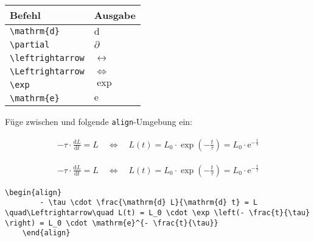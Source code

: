 \documentclass["WS\space 16-17\space -\space LaTeX-Kurs\space -\space Praesentation\space -\space 1.tex"]{subfiles}
\begin{document}
\begin{frame}[fragile]
	\begin{center}
		\begin{tabular}{ll}
			\toprule
			Befehl							&	Ausgabe					\\ \midrule
			\lstinline|\mathrm{d}|		&	$\mathrm{d}$		\\
			\lstinline|\partial|		&	$\partial$		
			\\
			\lstinline|\leftrightarrow|		&	$\leftrightarrow$		
      \\
			\lstinline|\Leftrightarrow|		&	$\Leftrightarrow$		
			\\
			\lstinline|\exp|					&	$\exp$		\\
      \lstinline|\mathrm{e}|		& $\mathrm{e}$		\\
			\bottomrule
		\end{tabular}
	\end{center}
	\pause\btVFill
	\Aufgabee
	Füge zwischen \qquote{$\tau$} und  folgende \lstinline[basicstyle=\normalfont\normalsize]|align|-Umgebung ein:
	\begin{outputbox}
	    \begin{align}
	      - \tau \cdot \frac{\mathrm{d} L}{\mathrm{d} t} = L \quad\Leftrightarrow\quad L(t) = L_0 \cdot \exp \left(- \frac{t}{\tau} \right) = L_0 \cdot \mathrm{e}^{- \frac{t}{\tau}}
	    \end{align}	
    \end{outputbox}
	\vspace{0.3cm}
\end{frame}
\begin{frame}[fragile]
	\Losung
	\begin{outputbox}
	    \begin{align}
	        - \tau \cdot \frac{\mathrm{d} L}{\mathrm{d} t} = L \quad\Leftrightarrow\quad L(t) = L_0 \cdot \exp \left(- \frac{t}{\tau} \right) = L_0 \cdot \mathrm{e}^{- \frac{t}{\tau}}
	    \end{align}
	\end{outputbox}

	\Code
	\begin{lstlisting}[gobble=4]
    \begin{align}
        - \tau \cdot \frac{\mathrm{d} L}{\mathrm{d} t} = L \quad\Leftrightarrow\quad L(t) = L_0 \cdot \exp \left(- \frac{t}{\tau} \right) = L_0 \cdot \mathrm{e}^{- \frac{t}{\tau}}
    \end{align}
	\end{lstlisting}
\end{frame}
\end{document}
